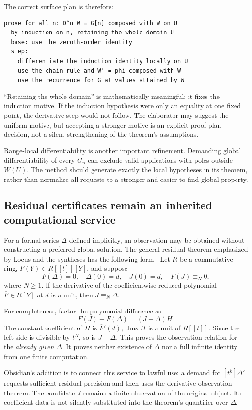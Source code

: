 \documentclass[11pt,a4paper]{article}
\theoremstyle{plain}\newtheorem{proposition}{Proposition}[section]
\theoremstyle{definition}\newtheorem{definition}[proposition]{Definition}
\theoremstyle{remark}\newtheorem{remark}[proposition]{Remark}
\begin{document}
The correct surface plan is therefore:
\begin{lstlisting}
prove for all n: D^n W = G[n] composed with W on U
  by induction on n, retaining the whole domain U
  base: use the zeroth-order identity
  step:
    differentiate the induction identity locally on U
    use the chain rule and W' = phi composed with W
    use the recurrence for G at values attained by W
\end{lstlisting}

``Retaining the whole domain'' is mathematically meaningful: it fixes the induction motive. If the induction hypothesis were only an equality at one fixed point, the derivative step would not follow. The elaborator may suggest the uniform motive, but accepting a stronger motive is an explicit proof-plan decision, not a silent strengthening of the theorem's assumptions.

Range-local differentiability is another important refinement. Demanding global differentiability of every \(G_n\) can exclude valid applications with poles outside \(W(U)\). The method should generate exactly the local hypotheses in its theorem, rather than normalize all requests to a stronger and easier-to-find global property.

\subsection{Residual certificates remain an inherited computational service}
For a formal series \(\Delta\) defined implicitly, an observation may be obtained without constructing a preferred global solution. The general residual theorem emphasized by Locus and the syntheses has the following form \cite{synA,synB}. Let \(R\) be a commutative ring, \(F(Y)\in R[[t]][Y]\), and suppose
\[
 F(\Delta)=0,\quad \Delta(0)=d,\quad J(0)=d,
 \quad F(J)\equiv_N0,
\]
where \(N\ge1\). If the derivative of the coefficientwise reduced polynomial \(\overline F\in R[Y]\) at \(d\) is a unit, then \(J\equiv_N\Delta\).

For completeness, factor the polynomial difference as
\[
 F(J)-F(\Delta)=(J-\Delta)H.
\]
The constant coefficient of \(H\) is \(\overline F'(d)\); thus \(H\) is a unit of \(R[[t]]\). Since the left side is divisible by \(t^N\), so is \(J-\Delta\). This proves the observation relation for the \emph{already given} \(\Delta\). It proves neither existence of \(\Delta\) nor a full infinite identity from one finite computation.

Obsidian's addition is to connect this service to lawful use: a demand for \([t^k]\Delta'\) requests sufficient residual precision and then uses the derivative observation theorem. The candidate \(J\) remains a finite observation of the original object. Its coefficient data is not silently substituted into the theorem's quantifier over \(\Delta\).
\end{document}
